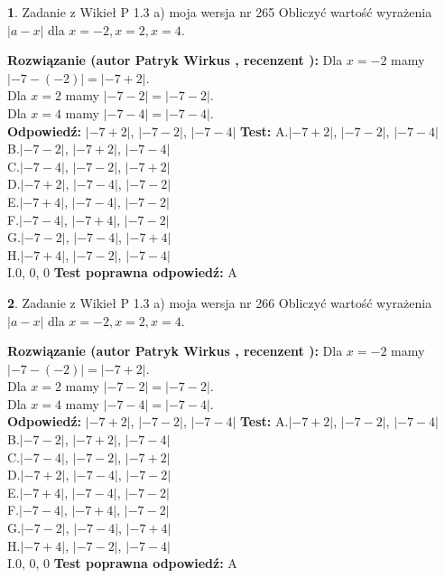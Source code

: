 \documentclass[12pt, a4paper]{article}
\theoremstyle{definition} %
\newtheorem{zad}{}
\newcommand{\zadStart}[1]{\begin{zad}#1\newline}
\newcommand{\zadStop}{\end{zad}}
\newcommand{\rozwStart}[2]{\noindent \textbf{Rozwiązanie (autor #1 , recenzent #2): }\newline}
\newcommand{\rozwStop}{\newline}
\newcommand{\odpStart}{\noindent \textbf{Odpowiedź:}\newline}
\newcommand{\odpStop}{\newline}
\newcommand{\testStart}{\noindent \textbf{Test:}\newline}
\newcommand{\testStop}{\newline}
\newcommand{\kluczStart}{\noindent \textbf{Test poprawna odpowiedź:}\newline}
\newcommand{\kluczStop}{\newline}
\begin{document}
\zadStart{Zadanie z Wikieł P 1.3 a) moja wersja nr 265}
Obliczyć wartość wyrażenia $|a - x|$ dla $x=-2,x=2,x=4$.
\zadStop
\rozwStart{Patryk Wirkus}{}
Dla $x = -2$ mamy $|-7 - (-2)| = |-7 + 2|$.\\
Dla $x = 2$ mamy $|-7 - 2| = |-7 - 2|$.\\
Dla $x = 4$ mamy $|-7 - 4| = |-7 - 4|$.\\
\rozwStop
\odpStart
$|-7 + 2|$, $|-7 - 2|$, $|-7 - 4|$
\odpStop
\testStart
A.$|-7 + 2|$, $|-7 - 2|$, $|-7 - 4|$\\
B.$|-7 - 2|$, $|-7 + 2|$, $|-7 - 4|$\\
C.$|-7 - 4|$, $|-7 - 2|$, $|-7 + 2|$\\
D.$|-7 + 2|$, $|-7 - 4|$, $|-7 - 2|$\\
E.$|-7 + 4|$, $|-7 - 4|$, $|-7 - 2|$\\
F.$|-7 - 4|$, $|-7 + 4|$, $|-7 - 2|$\\
G.$|-7 - 2|$, $|-7 - 4|$, $|-7 + 4|$\\
H.$|-7 + 4|$, $|-7 - 2|$, $|-7 - 4|$\\
I.$0$, $0$, $0$
\testStop
\kluczStart
A
\kluczStop



\zadStart{Zadanie z Wikieł P 1.3 a) moja wersja nr 266}
Obliczyć wartość wyrażenia $|a - x|$ dla $x=-2,x=2,x=4$.
\zadStop
\rozwStart{Patryk Wirkus}{}
Dla $x = -2$ mamy $|-7 - (-2)| = |-7 + 2|$.\\
Dla $x = 2$ mamy $|-7 - 2| = |-7 - 2|$.\\
Dla $x = 4$ mamy $|-7 - 4| = |-7 - 4|$.\\
\rozwStop
\odpStart
$|-7 + 2|$, $|-7 - 2|$, $|-7 - 4|$
\odpStop
\testStart
A.$|-7 + 2|$, $|-7 - 2|$, $|-7 - 4|$\\
B.$|-7 - 2|$, $|-7 + 2|$, $|-7 - 4|$\\
C.$|-7 - 4|$, $|-7 - 2|$, $|-7 + 2|$\\
D.$|-7 + 2|$, $|-7 - 4|$, $|-7 - 2|$\\
E.$|-7 + 4|$, $|-7 - 4|$, $|-7 - 2|$\\
F.$|-7 - 4|$, $|-7 + 4|$, $|-7 - 2|$\\
G.$|-7 - 2|$, $|-7 - 4|$, $|-7 + 4|$\\
H.$|-7 + 4|$, $|-7 - 2|$, $|-7 - 4|$\\
I.$0$, $0$, $0$
\testStop
\kluczStart
A
\kluczStop
\end{document}

